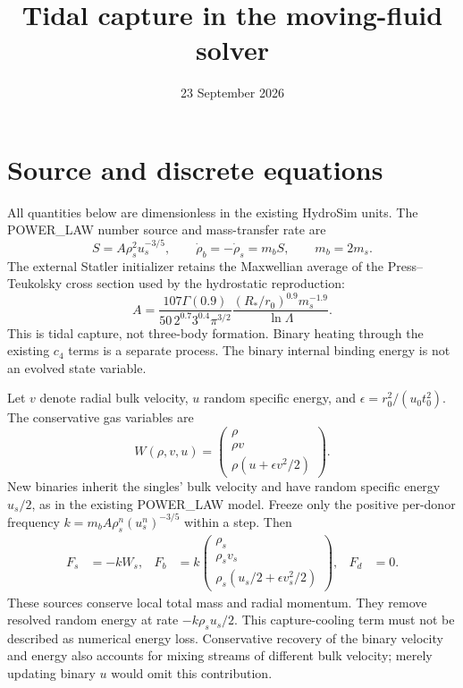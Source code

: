 \documentclass[11pt]{article}
\title{Tidal capture in the moving-fluid solver}
\author{}
\date{23 September 2026}
\begin{document}
\maketitle
\section{Source and discrete equations}
All quantities below are dimensionless in the existing HydroSim units.
The POWER\_LAW number source and mass-transfer rate are
\begin{equation}
 S=A\rho_s^2u_s^{-3/5},\qquad \dot\rho_b=-\dot\rho_s=m_b S,
 \qquad m_b=2m_s.
\end{equation}
The external Statler initializer retains the Maxwellian average of the
Press--Teukolsky cross section used by the hydrostatic reproduction:
\begin{equation}
 A=\frac{107\Gamma(0.9)}{50\,2^{0.7}3^{0.4}\pi^{3/2}}
 \frac{(R_*/r_0)^{0.9}m_s^{-1.9}}{\ln\Lambda}.
\end{equation}
This is tidal capture, not three-body formation. Binary heating through
the existing $c_4$ terms is a separate process. The binary internal binding
energy is not an evolved state variable.

Let $v$ denote radial bulk velocity, $u$ random specific energy, and
$\epsilon=r_0^2/(u_0t_0^2)$. The conservative gas variables are
\begin{equation}
 W(\rho,v,u)=\begin{pmatrix}\rho\\\rho v\\\rho(u+\epsilon v^2/2)\end{pmatrix}.
\end{equation}
New binaries inherit the singles' bulk velocity and have random specific
energy $u_s/2$, as in the existing POWER\_LAW model. Freeze only the positive
per-donor frequency $k=m_b A\rho_s^n(u_s^n)^{-3/5}$ within a step. Then
\begin{align}
 F_s&=-kW_s,&
 F_b&=k\begin{pmatrix}\rho_s\\\rho_s v_s\\\rho_s(u_s/2+\epsilon v_s^2/2)\end{pmatrix},&F_d&=0.
\end{align}
These sources conserve local total mass and radial momentum. They remove
resolved random energy at rate $-k\rho_su_s/2$. This capture-cooling term
must not be described as numerical energy loss. Conservative recovery of
the binary velocity and energy also accounts for mixing streams of different
bulk velocity; merely updating binary $u$ would omit this contribution.
\end{document}
